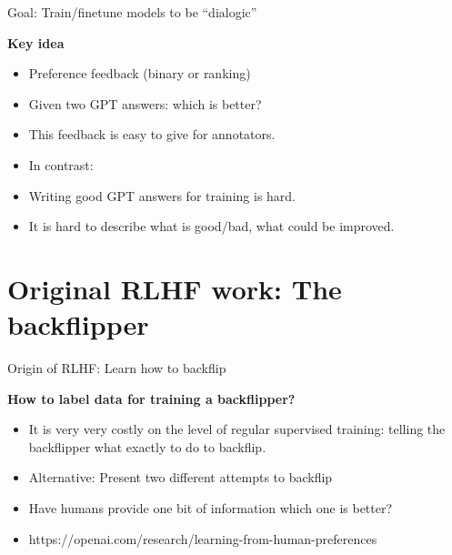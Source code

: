 \begin{vbframe}{Goal: Train/finetune models to be ``dialogic''}

\vfill

\textbf{Key idea}

	\begin{itemize}
		\item Preference feedback (binary or
                  ranking)
                  \item Given two GPT answers: which is
                    better?
                    \item This feedback is easy to give for
                      annotators.
                      \item In contrast:
                    \item Writing good GPT answers for
                      training is hard.
                    \item It is hard to describe what is good/bad,
                      what could be improved.
	\end{itemize}

\vfill

\end{vbframe}




\section{Original RLHF work: The backflipper}

\begin{vbframe}{Origin of RLHF: Learn how to backflip}

\vfill

\textbf{How to label data for training a backflipper?}

	\begin{itemize}
		\item It is very very costly on the level of
		regular supervised training: telling the
		backflipper what exactly to do to backflip.
                \item Alternative: Present two different
		attempts to backflip
                \item Have humans provide one bit of
		information which one is better?
\item https://openai.com/research/learning-from-human-preferences
	\end{itemize}

\vfill

\end{vbframe}


